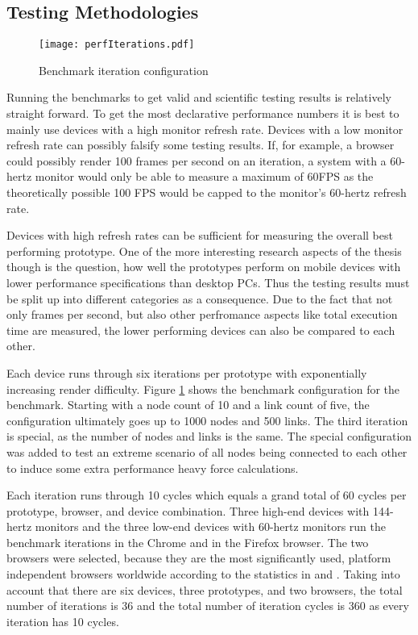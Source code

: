 \subsection{Testing Methodologies}

\begin{figure}
\centering
\texttt{[image: perfIterations.pdf]}
\caption{Benchmark iteration configuration}
\label{fig:perfIterations}
\end{figure}

Running the benchmarks to get valid and scientific testing results is relatively straight forward. To get the most declarative performance numbers it is best to mainly use devices with a high monitor refresh rate. Devices with a low monitor refresh rate can possibly falsify some testing results. If, for example, a browser could possibly render 100 frames per second on an iteration, a system with a 60-hertz monitor would only be able to measure a maximum of 60FPS as the theoretically possible 100 FPS would be capped to the monitor's 60-hertz refresh rate.

Devices with high refresh rates can be sufficient for measuring the overall best performing prototype. One of the more interesting research aspects of the thesis though is the question, how well the prototypes perform on mobile devices with lower performance specifications than desktop PCs. Thus the testing results must be split up into different categories as a consequence. Due to the fact that not only frames per second, but also other perfromance aspects like total execution time are measured, the lower performing devices can also be compared to each other.

Each device runs through six iterations per prototype with exponentially increasing render difficulty. Figure \ref{fig:perfIterations} shows the benchmark configuration for the benchmark. Starting with a node count of 10 and a link count of five, the configuration ultimately goes up to 1000 nodes and 500 links. The third iteration is special, as the number of nodes and links is the same. The special configuration was added to test an extreme scenario of all nodes being connected to each other to induce some extra performance heavy force calculations.

Each iteration runs through 10 cycles which equals a grand total of 60 cycles per prototype, browser, and device combination. Three high-end devices with 144-hertz monitors and the three low-end devices with 60-hertz monitors run the benchmark iterations in the Chrome and in the Firefox browser. The two browsers were selected, because they are the most significantly used, platform independent browsers worldwide according to the statistics in \cite{StatCounterBrowserMarketShare} and \cite{W3CBrowserMarketShare}. Taking into account that there are six devices, three prototypes, and two browsers, the total number of iterations is 36 and the total number of iteration cycles is 360 as every iteration has 10 cycles.

